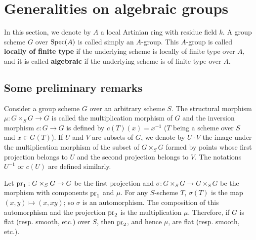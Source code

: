 \section{Generalities on algebraic groups}
In this section, we denote by $A$ a local Artinian ring with residue field $k$. A group scheme $G$ over $\mathrm{Spec}(A)$ is called simply an $A$-group. This $A$-group is called \textbf{locally of finite type} if the underlying scheme is locally of finite type over $A$, and it is called \textbf{algebraic} if the underlying scheme is of finite type over $A$.

\subsection{Some preliminary remarks}\label{scheme algebraic group preliminary remark subsection}
Consider a group scheme $G$ over an arbitrary scheme $S$. The structural morphism $\mu:G\times_SG\to G$ is called the multiplication morphism of $G$ and the inversion morphism $c:G\to G$ is defined by $c(T)(x)=x^{-1}$ ($T$ being a scheme over $S$ and $x\in G(T)$). If $U$ and $V$ are subsets of $G$, we denote by $U\cdot V$ the image under the multiplication morphism of the subset of $G\times_SG$ formed by points whose first projection belongs to $U$ and the second projection belongs to $V$. The notations $U^{-1}$ or $c(U)$ are defined similarly.\par
Let $\mathrm{pr}_1:G\times_SG\to G$ be the first projection and $\sigma:G\times_SG\to G\times_SG$ be the morphism with components $\mathrm{pr}_1$ and $\mu$. For any $S$-scheme $T$, $\sigma(T)$ is the map $(x,y)\mapsto(x,xy)$; so $\sigma$ is an automorphism. The composition of this automorphism and the projection $\mathrm{pr}_2$ is the multiplication $\mu$. Therefore, if $G$ is flat (resp. smooth, etc.) over $S$, then $\mathrm{pr}_2$, and hence $\mu$, are flat (resp. smooth, etc.).\par

